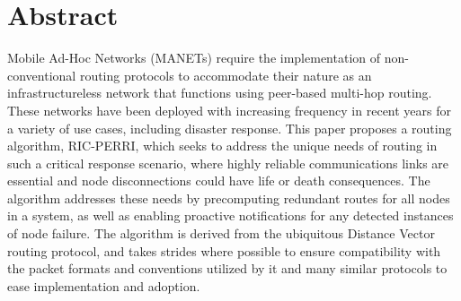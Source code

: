 \section*{Abstract}
Mobile Ad-Hoc Networks (MANETs) require the implementation of non-conventional routing protocols to accommodate their nature as an infrastructureless network that functions using peer-based multi-hop routing. These networks have been deployed with increasing frequency in recent years for a variety of use cases, including disaster response. This paper proposes a routing algorithm, RIC-PERRI, which seeks to address the unique needs of routing in such a critical response scenario, where highly reliable communications links are essential and node disconnections could have life or death consequences. The algorithm addresses these needs by precomputing redundant routes for all nodes in a system, as well as enabling proactive notifications for any detected instances of node failure. The algorithm is derived from the ubiquitous Distance Vector routing protocol, and takes strides where possible to ensure compatibility with the packet formats and conventions utilized by it and many similar protocols to ease implementation and adoption.